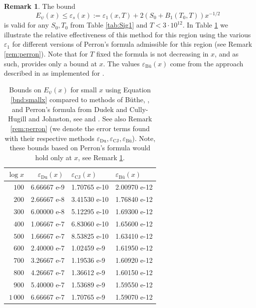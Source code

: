 \documentclass[10pt]{amsart}
\theoremstyle{definition}
\newtheorem{Rem}[prop]{Remark}
\numberwithin{equation}{section}
\begin{document}
\begin{Rem}\label{rem:lowx}
The bound 
\begin{equation}
 \label{bnd:smallx} E_{\psi}(x) \le  \varepsilon_s(x) :=  \varepsilon_1(x,T) + 2(S_0 + B_1(T_0,T))x^{-1/2}
 \end{equation}
is valid for any $S_0,T_0$ from Table \ref{tab:Sig1} and $T<3\cdot 10^{12}$.
In Table \ref{tab:smallx} we illustrate the relative effectiveness of this method for this region using the various $\varepsilon_1$ for different versions of Perron's formula admissible for this region (see  Remark \ref{rem:perron}).
Note that for $T$ fixed the formula is not decreasing in $x$, and as such, provides only a bound at $x$.
The values $\varepsilon_{\text{B\"u}}(x)$ come from the approach described in \cite{Bu16} as implemented for \cite{BKLNW21}.
\end{Rem}
%
\begin{table}[h!]
\centering
\caption{Bounds on $ E_{\psi}(x) $ for small $x$ using Equation \eqref{bnd:smallx} compared to methods of B\"uthe, \cite{Bu16}, and Perron's formula from Dudek and Cully-Hugill and Johnston, see \cite{Dud16} and \cite{CulJoh21}. See also Remark \ref{rem:perron} (we denote the error terms found with their respective methods $\varepsilon_{\text{Du}}, \varepsilon_{\text{CJ}}, \varepsilon_{\text{B\"u}}$).
Note, these bounds based on Perron's formula would hold only at $x$, see Remark \ref{rem:lowx}.}\label{tab:smallx}
\begin{tabular}{|r|l|l|l|}
\hline
$\log x$ & $\quad\varepsilon_{\text{Du}}(x)$ & \quad$\varepsilon_{\text{CJ}}(x)$ & \quad$\varepsilon_{\text{B\"u}}(x)$ \\
\hline
$100$ & 6.66667 e-9 &1.70765 e-10 &2.00970 e-12  \\
$200$ & 2.66667 e-8 &3.41530 e-10 &1.76840 e-12  \\
$300$ & 6.00000 e-8 &5.12295 e-10 &1.69300 e-12  \\
$400$ & 1.06667 e-7 &6.83060 e-10 &1.65600 e-12  \\
$500$ & 1.66667 e-7&8.53825 e-10 &1.63410 e-12  \\
$600$ & 2.40000 e-7 &1.02459 e-9 &1.61950 e-12  \\
$700$ & 3.26667 e-7  &1.19536 e-9 &1.60920 e-12  \\
$800$ & 4.26667 e-7 &1.36612 e-9 &1.60150 e-12  \\
$900$ & 5.40000 e-7 &1.53689 e-9 &1.59550 e-12  \\
$1\,000$ & 6.66667 e-7 &1.70765 e-9 &1.59070 e-12  \\

\hline
\end{tabular}
\end{table}
\end{document}
